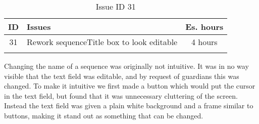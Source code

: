 \begin{longtable} { | c | p{12cm} | c | } 
\hline
	ID 	&	Issues	&		 Es. hours \\\hline
	31 	&	Rework sequenceTitle box to look editable	&	4 hours \\\hline
\caption{Issue ID 31}
\label{tab:spr2_reworktitlebox}
\end{longtable}

Changing the name of a sequence was originally not intuitive. It was in no way visible that the text field was editable, and by request of guardians this was changed. To make it intuitive we first made a button which would put the cursor in the text field, but found that it was unnecessary cluttering of the screen. Instead the text field was given a plain white background and a frame similar to buttons, making it stand out as something that can be changed. 